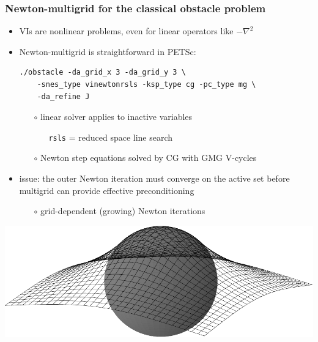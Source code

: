 \documentclass[svgnames,
               hyperref={colorlinks,citecolor=DeepPink4,linkcolor=FireBrick,urlcolor=Maroon},
               usepdftitle=false]  %
               {beamer}
\begin{document}
\begin{frame}[fragile]
\frametitle{Newton-multigrid for the classical obstacle problem}

\begin{itemize}
\item VIs are nonlinear problems, even for linear operators like $-\nabla^2$
\item Newton-multigrid is straightforward in PETSc:
\begin{Verbatim}[xleftmargin=13mm,fontsize=\scriptsize]
./obstacle -da_grid_x 3 -da_grid_y 3 \
    -snes_type vinewtonrsls -ksp_type cg -pc_type mg \
    -da_refine J
\end{Verbatim}
    \begin{itemize}
    \item[$\circ$] linear solver applies to inactive variables
        \begin{itemize}
        \item[] \texttt{rsls} = reduced space line search
        \end{itemize}
    \item[$\circ$] Newton step equations solved by CG with GMG V-cycles
    \end{itemize}
\item issue: the outer Newton iteration must converge on the active set \alert{before} multigrid can provide effective preconditioning
    \begin{itemize}
    \item[$\circ$] grid-dependent (growing) Newton iterations
    \end{itemize}
\end{itemize}

\medskip
\hspace{10mm} \includegraphics[height=0.2\textheight]{images/obstacle65.pdf}


\end{frame}
\end{document}
